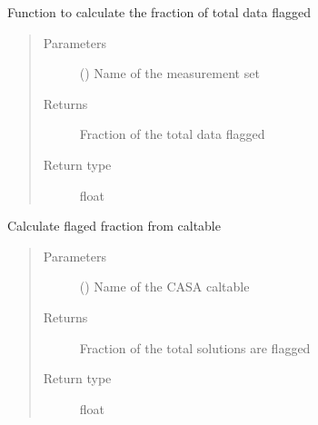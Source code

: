 \documentclass[letterpaper,10pt,english]{sphinxmanual}
\begin{document}
\begin{fulllineitems}
\label{\detokenize{paircars:paircars.basic_func.calc_flag_fraction}}
\sphinxAtStartPar
Function to calculate the fraction of total data flagged
\begin{quote}\begin{description}
\item[{Parameters}] \leavevmode
\sphinxAtStartPar
{} () \textendash{} Name of the measurement set

\item[{Returns}] \leavevmode
\sphinxAtStartPar
Fraction of the total data flagged

\item[{Return type}] \leavevmode
\sphinxAtStartPar
float

\end{description}\end{quote}

\end{fulllineitems}


\begin{fulllineitems}
\label{\detokenize{paircars:paircars.basic_func.calc_flag_fraction_caltable}}
\sphinxAtStartPar
Calculate flaged fraction from caltable
\begin{quote}\begin{description}
\item[{Parameters}] \leavevmode
\sphinxAtStartPar
{} () \textendash{} Name of the CASA caltable

\item[{Returns}] \leavevmode
\sphinxAtStartPar
Fraction of the total solutions are flagged

\item[{Return type}] \leavevmode
\sphinxAtStartPar
float

\end{description}\end{quote}

\end{fulllineitems}
\end{document}

